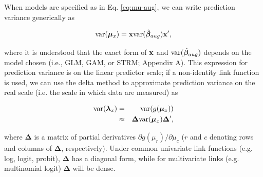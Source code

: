 \documentclass[12pt,english]{article}
\begin{document}
\begin{spacing}{1.9}
When models are specified as in Eq. \ref{eq:mu-aug}, we can write prediction variance generically as
\begin{linenomath*}
\begin{equation}
  \label{eq:var-mu}
  {\rm var}(\boldsymbol{\mu}_x)= {\bf x} {\rm var}(\hat{\boldsymbol{\beta}}_{aug}) {\bf x}^\prime,
\end{equation}
\end{linenomath*}
where it is understood that the exact form of ${\bf x}$ and ${\rm var}(\hat{\boldsymbol{\beta}}_{aug})$ depends on the model chosen (i.e., GLM, GAM, or STRM; Appendix A). This expression for prediction variance is on the linear predictor scale; if a non-identity link function is used, we can use the delta method \citep{Dorfman1938,VerHoef2012} to approximate prediction variance on the real scale (i.e. the scale in which data are measured) as
\begin{linenomath*}
\begin{eqnarray}
  \label{eq:var-lambda}
  {\rm var}(\boldsymbol{\lambda}_x) & = & {\rm var}(g(\boldsymbol{\mu}_x)) \\
  & \approx & \boldsymbol{\Delta} {\rm var}(\boldsymbol{\mu}_x)\boldsymbol{\Delta}^\prime,
\end{eqnarray}
\end{linenomath*}
where $\boldsymbol{\Delta}$ is a matrix of partial derivatives $\partial g(\mu_r)/\partial \mu_c$ ($r$ and $c$ denoting rows and columns of $\boldsymbol{\Delta}$, respectively).  Under common univariate link functions (e.g. log, logit, probit), $\boldsymbol{\Delta}$ has a diagonal form, while for multivariate links (e.g. multinomial logit) $\boldsymbol{\Delta}$ will be dense.


\end{spacing}
\end{document}
